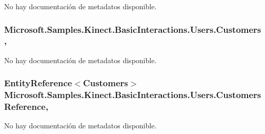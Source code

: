 No hay documentación de metadatos disponible. 

\hypertarget{class_microsoft_1_1_samples_1_1_kinect_1_1_basic_interactions_1_1_users_a4e38a3fd863bd393aa366e2b32456fee}{
\subsubsection[{Customers}]{ Microsoft.\-Samples.\-Kinect.\-Basic\-Interactions.\-Users.\-Customers\hspace{0.3cm}{\ttfamily [get]}, {\ttfamily [set]}}}\label{class_microsoft_1_1_samples_1_1_kinect_1_1_basic_interactions_1_1_users_a4e38a3fd863bd393aa366e2b32456fee}


No hay documentación de metadatos disponible. 

\hypertarget{class_microsoft_1_1_samples_1_1_kinect_1_1_basic_interactions_1_1_users_ac2822ab9388d38e3fe31d66841b99e30}{
\subsubsection[{Customers\-Reference}]{\setlength{\rightskip}{0pt plus 5cm}Entity\-Reference$<${\bf Customers}$>$ Microsoft.\-Samples.\-Kinect.\-Basic\-Interactions.\-Users.\-Customers\-Reference\hspace{0.3cm}{\ttfamily [get]}, {\ttfamily [set]}}}\label{class_microsoft_1_1_samples_1_1_kinect_1_1_basic_interactions_1_1_users_ac2822ab9388d38e3fe31d66841b99e30}


No hay documentación de metadatos disponible. 

